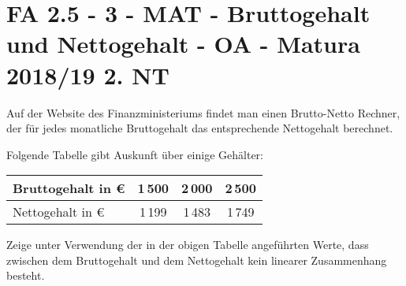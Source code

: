 \section{FA 2.5 - 3 - MAT - Bruttogehalt und Nettogehalt - OA - Matura 2018/19 2. NT}

\begin{beispiel}[FA 2.5]{1}
Auf der Website des Finanzministeriums findet man einen Brutto-Netto Rechner, der für jedes monatliche Bruttogehalt das entsprechende Nettogehalt berechnet.

Folgende Tabelle gibt Auskunft über einige Gehälter:

\begin{center}
\begin{tabular}{|l|c|c|c|}\hline
Bruttogehalt in \euro &1\,500&2\,000&2\,500\\ \hline
Nettogehalt in \euro &1\,199&1\,483&1\,749\\ \hline
\end{tabular}
\end{center}

Zeige unter Verwendung der in der obigen Tabelle angeführten Werte, dass zwischen dem Bruttogehalt und dem Nettogehalt kein linearer Zusammenhang besteht.

\end{beispiel}